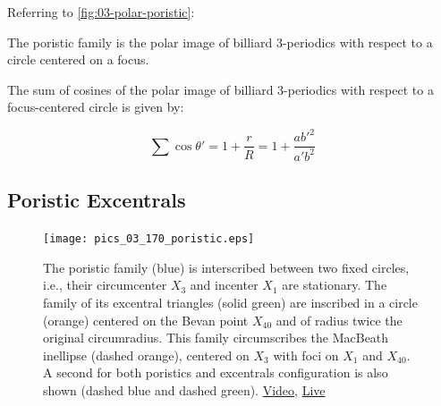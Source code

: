 
 
Referring to \cref{fig:03-polar-poristic}:

\begin{corollary}
The poristic family is the polar image of billiard 3-periodics with respect to a circle centered on a focus. 
\end{corollary}

\begin{corollary}
The sum of cosines of the polar image of billiard 3-periodics with respect to a focus-centered circle is given by:

\begin{equation}
\sum\cos\theta' = 1+\frac{r}{R} = 1+\frac{a b'^2}{a' b^2}
\label{eq:03-bic-cos}
\end{equation}
\end{corollary}

\subsection{Poristic Excentrals}

\begin{figure}
    \centering
    \texttt{[image: pics\_03\_170\_poristic.eps]}
    \caption{The poristic family (blue) is interscribed between two fixed circles, i.e., their circumcenter $X_3$ and incenter $X_1$ are stationary. The family of its excentral triangles (solid green) are inscribed in a circle (orange) centered on the Bevan point $X_{40}$ and of radius twice the original circumradius. This family circumscribes the MacBeath inellipse (dashed orange), centered on $X_3$ with foci on $X_1$ and $X_{40}$. A second for both poristics and excentrals configuration is also shown (dashed blue and dashed green).  \href{https://youtu.be/DS4ryndDK6Q}{Video}, \href{https://bit.ly/2RoYJHm}{Live}}
    \label{fig:03-poristic-excentrals}
\end{figure}

